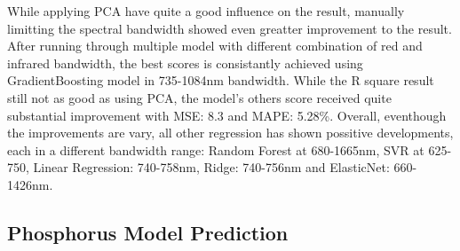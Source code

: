 



While applying PCA have quite a good influence on the result, manually limitting the spectral bandwidth showed even greatter improvement to the result. After running through multiple model with different combination of red and infrared bandwidth, the best scores is consistantly achieved using GradientBoosting model in 735-1084nm bandwidth. While the R square result still not as good as using PCA, the model's  others score received quite substantial improvement  with MSE: 8.3 and MAPE: 5.28\%. Overall, eventhough the improvements are vary, all other regression has shown possitive developments, each in a different bandwidth range: Random Forest at 680-1665nm, SVR at 625-750, Linear Regression: 740-758nm, Ridge: 740-756nm and ElasticNet: 660-1426nm.

\newpage
\subsection{Phosphorus Model Prediction}

